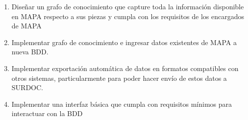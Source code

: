 \begin{enumerate}
\item Diseñar un grafo de conocimiento que capture toda la información disponible en MAPA respecto a sus piezas y cumpla con los requisitos de los encargados de MAPA %


\item Implementar grafo de conocimiento e ingresar datos existentes de MAPA a nueva BDD.

\item Implementar exportación automática de datos en formatos compatibles con otros sistemas, particularmente para poder hacer envío de estos datos a SURDOC.

\item Implementar una interfaz básica que cumpla con requisitos mínimos para interactuar con la BDD
\end{enumerate}